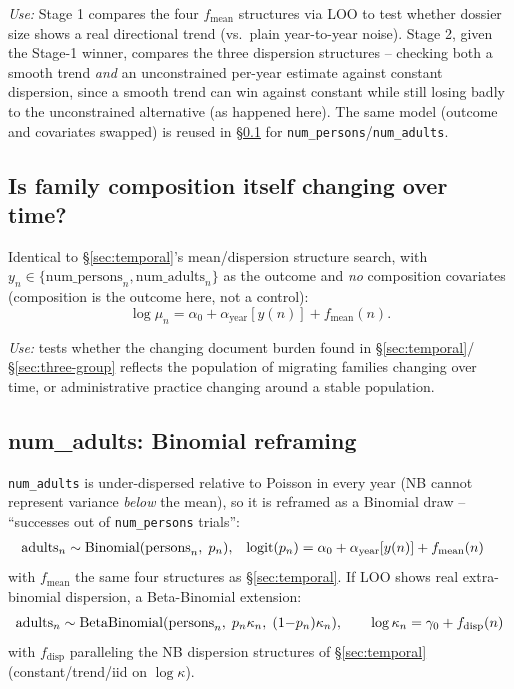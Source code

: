 \textit{Use:} Stage 1 compares the four $f_{\text{mean}}$ structures via LOO
to test whether dossier size shows a real directional trend (vs.\ plain
year-to-year noise). Stage 2, given the Stage-1 winner, compares the three
dispersion structures -- checking both a smooth trend \emph{and} an
unconstrained per-year estimate against constant dispersion, since a smooth
trend can win against constant while still losing badly to the unconstrained
alternative (as happened here). The same model (outcome and covariates
swapped) is reused in \S\ref{sec:family-temporal} for \texttt{num\_persons}/\texttt{num\_adults}.

\subsection{Is family composition itself changing over time?}
\label{sec:family-temporal}

Identical to \S\ref{sec:temporal}'s mean/dispersion structure search, with
$y_n \in \{\text{num\_persons}_n, \text{num\_adults}_n\}$ as the outcome and
\emph{no} composition covariates (composition is the outcome here, not a
control):
\begin{equation}
  \log\mu_n = \alpha_0 + \alpha_{\text{year}}[y(n)] + f_{\text{mean}}(n).
\end{equation}

\textit{Use:} tests whether the changing document burden found in
\S\ref{sec:temporal}/\S\ref{sec:three-group} reflects the population of
migrating families changing over time, or administrative practice changing
around a stable population.

\subsection{num\_adults: Binomial reframing}
\label{sec:num-adults}

\texttt{num\_adults} is under-dispersed relative to Poisson in every year
(NB cannot represent variance \emph{below} the mean), so it is reframed as a
Binomial draw -- ``successes out of \texttt{num\_persons} trials'':
\begin{align}
  \text{adults}_n &\sim \mathrm{Binomial}(\text{persons}_n,\; p_n), &
  \mathrm{logit}(p_n) &= \alpha_0 + \alpha_{\text{year}}[y(n)] + f_{\text{mean}}(n)
\end{align}
with $f_{\text{mean}}$ the same four structures as \S\ref{sec:temporal}. If
LOO shows real extra-binomial dispersion, a Beta-Binomial extension:
\begin{equation}
  \text{adults}_n \sim \mathrm{BetaBinomial}(\text{persons}_n,\; p_n\kappa_n,\; (1{-}p_n)\kappa_n),
  \qquad \log\kappa_n = \gamma_0 + f_{\text{disp}}(n)
\end{equation}
with $f_{\text{disp}}$ paralleling the NB dispersion structures of
\S\ref{sec:temporal} (constant/trend/iid on $\log\kappa$).

